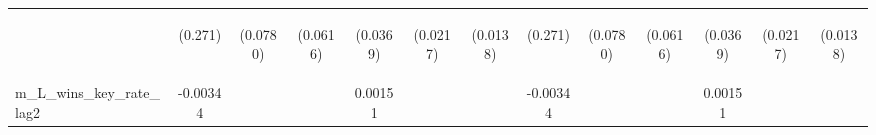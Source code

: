 \documentclass[]{article}
\begin{document}
\begin{center}
\begin{tabular}{lcccccccccccc}
\vspace{4pt} & \begin{footnotesize}(0.271)\end{footnotesize} & \begin{footnotesize}(0.0780)\end{footnotesize} & \begin{footnotesize}(0.0616)\end{footnotesize} & \begin{footnotesize}(0.0369)\end{footnotesize} & \begin{footnotesize}(0.0217)\end{footnotesize} & \begin{footnotesize}(0.0138)\end{footnotesize} & \begin{footnotesize}(0.271)\end{footnotesize} & \begin{footnotesize}(0.0780)\end{footnotesize} & \begin{footnotesize}(0.0616)\end{footnotesize} & \begin{footnotesize}(0.0369)\end{footnotesize} & \begin{footnotesize}(0.0217)\end{footnotesize} & \begin{footnotesize}(0.0138)\end{footnotesize} \\
m\_L\_wins\_key\_rate\_lag2 & -0.00344 &  &  & 0.00151 &  &  & -0.00344 &  &  & 0.00151 &  &  \\

\end{tabular}
\end{center}
\end{document}
